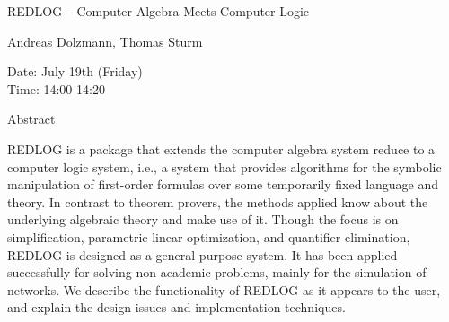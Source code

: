 \begin{center}
\LARGE
REDLOG -- Computer Algebra Meets Computer Logic 

\end{center}

\begin{center}
\Large
Andreas Dolzmann, Thomas Sturm

\end{center}

\noindent
Date:  July 19th (Friday)\\
Time:  14:00-14:20\\

\begin{center}
\large
Abstract
\end{center}

REDLOG is a package that extends the computer algebra system reduce to a computer logic
system, i.e., a system that provides algorithms for the symbolic manipulation of first-order
formulas over some temporarily fixed language and theory. In contrast to theorem provers, the
methods applied know about the underlying algebraic theory and make use of it. Though the focus
is on simplification, parametric linear optimization, and quantifier elimination, REDLOG is
designed as a general-purpose system. It has been applied successfully for solving non-academic
problems, mainly for the simulation of networks. We describe the functionality of REDLOG as it
appears to the user, and explain the design issues and implementation techniques. 

